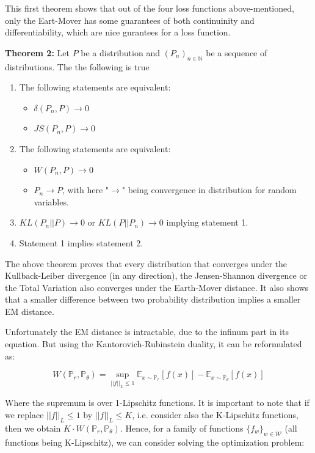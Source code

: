 \documentclass[11pt,a4paper,twoside]{report}
\begin{document}
This first theorem shows that out of the four loss functions above-mentioned, only the Eart-Mover has some guarantees of both continuinity and differentiability, which are nice gurantees for a loss function.

\textbf{Theorem 2:} Let $P$ be a distribution and $(P_n)_{n \in \mathbb{N}}$ be a sequence of distributions. The the following is true

\begin{enumerate}
    \item The following statements are equivalent:
    \begin{itemize}
        \item $\delta(P_n, P) \rightarrow 0$
        \item $JS(P_n, P) \rightarrow 0$
    \end{itemize}
    \item The following statements are equivalent:
    \begin{itemize}
        \item $W(P_n, P) \rightarrow 0$
        \item $P_n \rightarrow P$, with here "$\rightarrow$" being convergence in distribution for random variables. 
    \end{itemize}
    \item $KL(P_n||P) \rightarrow 0$ or $KL(P||P_n) \rightarrow 0$ implying statement 1.
    \item Statement 1 implies statement 2.
\end{enumerate}

The above theorem proves that every distribution that converges under the Kullback-Leiber divergence (in any direction), the Jensen-Shannon divergence or the Total Variation also converges under the Earth-Mover distance. It also shows that a smaller difference between two probability distribution implies a smaller EM distance. 

Unfortunately the EM distance is intractable, due to the infinum part in its equation. But using the Kantorovich-Rubinstein duality, it can be reformulated as:



\begin{equation}
    W(\mathbb{P}_r, \mathbb{P}_{\theta}) = \sup_{||f||_L \leq 1} \mathbb{E}_{x \sim \mathbb{P}_r} [f(x)] - \mathbb{E}_{x \sim \mathbb{P}_{\theta}} [f(x)] 
\end{equation}

Where the supremum is over 1-Lipschitz functions. It is important to note that if we replace $||f||_L \leq 1$ by $||f||_L \leq K$, i.e. consider also the K-Lipschitz functions, then we obtain $K \cdot W(\mathbb{P}_r, \mathbb{P}_{\theta})$. Hence, for a family of functions $\{f_w\}_{w \in \mathcal{W}}$ (all functions being K-Lipschitz), we can consider solving the optimization problem:
\end{document}
